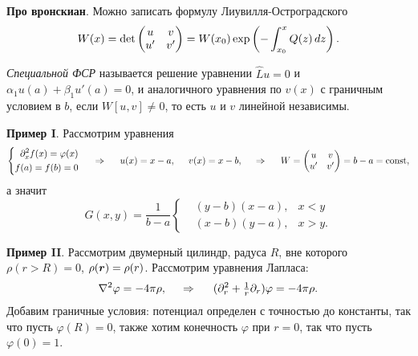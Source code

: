 \textbf{Про вронскиан}. Можно записать формулу Лиувилля-Остроградского
\begin{equation*}
    W(x) = 
    \det \begin{pmatrix}
        u & v  \\
        u' & v'  \\
    \end{pmatrix}
    =
    W(x_0) \exp\left(
        - \int_{x_0}^{x}  Q(z) \, d z
    \right).
\end{equation*}

\begin{to_def}
    \textit{Специальной ФСР} называется решение уравнении $\hat{L} u = 0$ и $\alpha_1 u(a) + \beta_1 u'(a) = 0$, и аналогичного уравнения по $v(x)$ с граничным условием в $b$, 
    если $W[u, v] \neq 0$, то есть $u$ и $v$ линейной независимы. 
\end{to_def}



\textbf{Пример I}. Рассмотрим уравнения
\begin{equation*}
    \left\{\begin{aligned}
        \partial_x^2 f(x) = \varphi(x) \\
        f(a) = f(b) = 0
    \end{aligned}\right.
    \hspace{0.5cm} \Rightarrow \hspace{0.5cm}
    u(x) = x - a,
    \hspace{5 mm} 
    v(x) = x - b,
    \hspace{0.5cm} \Rightarrow \hspace{0.5cm}
    W = \begin{pmatrix}
        u & v  \\
        u' & v'  \\
    \end{pmatrix} = b-a = \textnormal{const},
\end{equation*}
а значит
\begin{equation*}
    G(x, y) = \frac{1}{b-a} \left\{\begin{aligned}
        &(y-b)(x-a), &x < y \\
        &(x-b)(y-a), &x > y.
    \end{aligned}\right.
\end{equation*}


\textbf{Пример II}. Рассмотрим двумерный цилиндр, радуса $R$, вне которого $\rho(r > R) = 0$, $\rho(\mbox{\boldmath $r$}) = \rho(r)$. Рассмотрим уравнения Лапласа:
\begin{equation*}
    \nabla^2 \varphi = - 4 \pi \rho,
    \hspace{0.5cm} \Rightarrow \hspace{0.5cm}
    (\partial_r^2 + \tfrac{1}{r} \partial_r) \varphi = - 4 \pi \rho.
\end{equation*}
Добавим граничные условия: потенциал определен с точностью до константы, так что пусть $\varphi(R) = 0$, также хотим конечность $\varphi$ при $r=0$, так что пусть $\varphi(0) = 1$.

